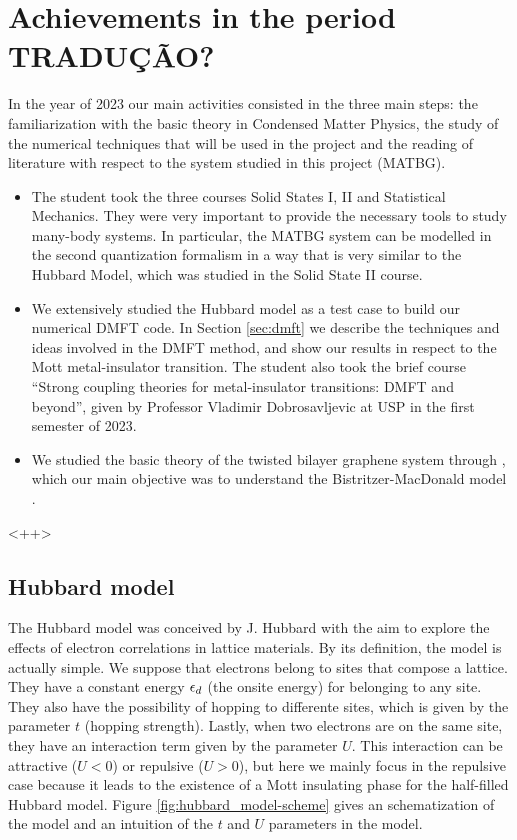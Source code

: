 \documentclass[12pt]{report}
\begin{document}
\chapter{Achievements in the period \textbf{TRADUÇÃO?}}

In the year of 2023 our main activities consisted in the three main steps: the familiarization with the basic theory in Condensed Matter Physics, the study of the numerical techniques that will be used in the project and the reading of literature with respect to the system studied in this project (MATBG).

\begin{itemize}
\item The student took the three courses Solid States I, II and Statistical Mechanics. They were very important to provide the necessary tools to study many-body systems. In particular, the MATBG system can be modelled in the second quantization formalism in a way that is very similar to the Hubbard Model, which was studied in the Solid State II course.

\item We extensively studied the Hubbard model \cite{hubbard1963} as a test case to build our numerical DMFT code. In Section \ref{sec:dmft} we describe the techniques and ideas involved in the DMFT method, and show our results in respect to the Mott metal-insulator transition. The student also took the brief course ``Strong coupling theories for metal-insulator transitions: DMFT and beyond'', given by Professor Vladimir Dobrosavljevic at USP in the first semester of 2023.

\item We studied the basic theory of the twisted bilayer graphene system through \cite{handbook2019}, which our main objective was to understand the Bistritzer-MacDonald model \cite{macdonald2011}.
\end{itemize}
<++>

\section{Hubbard model} \label{sec:hubbard}


The Hubbard model was conceived by J. Hubbard with the aim to explore the effects of electron correlations in lattice materials. By its definition, the model is actually simple. We suppose that electrons belong to sites that compose a lattice. They have a constant energy $\epsilon_d$ (the onsite energy) for belonging to any site. They also have the possibility of hopping to differente sites, which is given by the parameter $t$ (hopping strength). Lastly, when two electrons are on the same site, they have an interaction term given by the parameter $U$. This interaction can be attractive ($U < 0$) or repulsive ($U > 0$), but here we mainly focus in the repulsive case because it leads to the existence of a Mott insulating phase \cite{georges1996} for the half-filled Hubbard model. Figure \ref{fig:hubbard_model-scheme} gives an schematization of the model and an intuition of the $t$ and $U$ parameters in the model.
\end{document}
